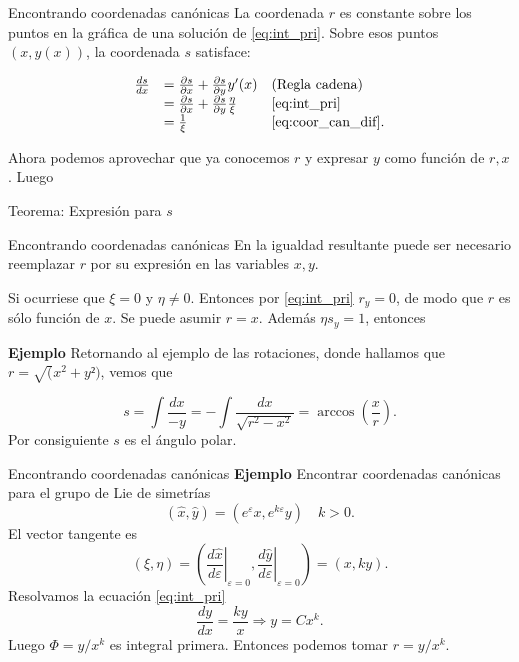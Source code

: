 \documentclass[handout,hyperref={colorlinks=true}]{beamer}
\renewcommand{\epsilon}{\varepsilon}
\begin{document}
\begin{frame}{Encontrando coordenadas canónicas}
La coordenada $r$ es constante sobre los puntos en la gráfica de una solución de \eqref{eq:int_pri}. Sobre esos puntos $(x,y(x))$, la coordenada $s$ satisface:

\begin{equation} \label{eq:coor_can_s}
\begin{array}{lll}
\frac{ds}{dx}&=\frac{\partial s}{\partial x}+\frac{\partial s}{\partial y} y'(x) & \hbox{(Regla cadena)}\\
&=\frac{\partial s}{\partial x}+\frac{\partial s}{\partial y} \frac{\eta}{\xi} &
  \eqref{eq:int_pri}\\
&=\frac{1}{\xi} &\hbox{\eqref{eq:coor_can_dif}}.
\end{array}
\end{equation}

Ahora podemos aprovechar que ya conocemos $r$ y  expresar $y$ como función de $r,x$. Luego

\begin{block}{Teorema: Expresión para $s$}
 
\end{block}

 






\end{frame}




\begin{frame}{Encontrando coordenadas canónicas}
En la igualdad resultante puede ser necesario reemplazar $r$ por su expresión en las variables $x,y$.


Si ocurriese que $\xi=0$ y $\eta\neq 0$. Entonces por \eqref{eq:int_pri} $r_y=0$, de modo que $r$ es sólo función de $x$. Se puede asumir $r=x$. Además $\eta s_y=1$, entonces


\textbf{Ejemplo} Retornando al ejemplo de las rotaciones, donde hallamos que $r=\sqrt(x^2+y²)$, vemos que

\[s=\int\frac{dx}{-y}=-\int\frac{dx}{\sqrt{r^2-x^2}}=\arccos\left(\frac{x}{r}\right).\]
Por consiguiente  $s$ es el ángulo polar.

\end{frame}



\begin{frame}{Encontrando coordenadas canónicas}\label{pag_ejem_canon1}
\textbf{Ejemplo} Encontrar coordenadas canónicas para el grupo de Lie de simetrías
\[(\hat{x},\hat{y})=(e^{\epsilon}x,e^{k\epsilon}y)\quad k>0.\]
El vector tangente es
\[(\xi,\eta)=\left(\left.\frac{d\hat{x}}{d\epsilon}\right|_{\epsilon=0},\left.\frac{d\hat{y}}{d\epsilon}\right|_{\epsilon=0}\right)=(x,ky).\]
Resolvamos la ecuación  \eqref{eq:int_pri} 
\[\frac{dy}{dx}=\frac{ky}{x}\Rightarrow y=Cx^k.\]
Luego $\Phi=y/x^k$ es integral primera. Entonces podemos tomar $r=y/x^k$. 




\end{frame}
\end{document}
